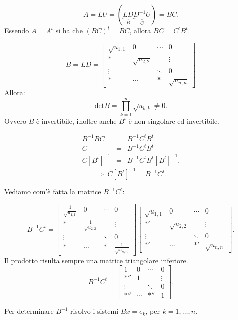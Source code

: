 \[A = LU = \left(\underbrace{LD}_{B} \underbrace{D^{-1}U}_{C} \right) = BC.\]
Essendo $A = A^t$ si ha che $(BC)^t = BC$, allora $BC = C^tB^t$.

\[ B = LD = \left[
\begin{array}{cccc}
\sqrt{u_{1,1}} & 0 & \cdots & 0 \\
* & \sqrt{u_{2,2}} & & \vdots \\
\vdots & & \ddots & 0 \\
* &\cdots & * & \sqrt{u_{n,n}}
\end{array}
\right]
\]
Allora:
\[ \textrm{det}B = \prod_{k = 1}^{n} \sqrt{u_{k,k}} \neq 0.\]
Ovvero $B$ è invertibile, inoltre anche $B^t$ è non singolare ed invertibile.

\[
\begin{array}{rcl}
B^{-1}BC & = & B^{-1}C^tB^t \\
      C & = & B^{-1}C^tB^t \\
C\left[B^t\right]^{-1} & = & B^{-1}C^tB^t\left[B^t\right]^{-1}.
\end{array}
\]
\[
\Rightarrow \ C\left[B^t\right]^{-1} = B^{-1}C^t.
\]

Vediamo com'è fatta la matrice $B^{-1}C^t$:

\[B^{-1}C^t =
\left[
\begin{array}{cccc}
\frac{1}{\sqrt{u_{1,1}}} & 0 & \cdots & 0 \\
* & \frac{1}{\sqrt{u_{2,2}}} & & \vdots \\
\vdots & & \ddots & 0 \\
* &\cdots & * & \frac{1}{\sqrt{u_{n,n}}}
\end{array}
\right]
\left[
\begin{array}{cccc}
\sqrt{u_{1,1}} & 0 & \cdots & 0 \\
*' & \sqrt{u_{2,2}} & & \vdots \\
\vdots & & \ddots & 0 \\
*' &\cdots & *' & \sqrt{u_{n,n}}
\end{array}
\right].
\]
Il prodotto risulta sempre una matrice triangolare inferiore.
\[B^{-1}C^t =
\left[
\begin{array}{cccc}
1 & 0 & \cdots & 0 \\
*'' & 1 & & \vdots \\
\vdots & & \ddots & 0 \\
*'' &\cdots & *'' & 1
\end{array}
\right].\]

Per determinare $B^{-1}$ risolvo i sistemi $Bx = e_k$, per $k = 1, \ldots, n$.

